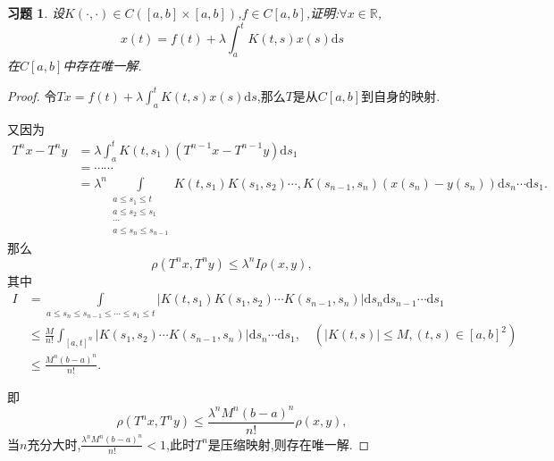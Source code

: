 \documentclass[a4paper,oneside,12pt]{ctexart}
\theoremstyle{plain}
\newtheorem{exercise}{习题}
\theoremstyle{nonumberplain}
\theoremstyle{nonumberplain}
\newtheorem{proof}{证明.}
\newcommand{\dif}{\mathrm{d}}
\newcommand{\R}{\mathbb{R}}
\newcommand{\abs}[1]{\left\vert#1\right\vert}
\begin{document}
    \begin{exercise}
        \label{ex:4}
        设$K(\cdot,\cdot)\in C([a,b]\times [a,b])$,$f\in C[a,b]$,证明:$\forall x\in \R$,
        \begin{equation*}
            x(t)=f(t)+\lambda\int_a^tK(t,s)x(s)\dif s
        \end{equation*}
        在$C[a,b]$中存在唯一解.
    \end{exercise}

    \begin{proof}
        令$Tx=f(t)+\lambda\int_a^tK(t,s)x(s)\dif s$,那么$T$是从$C[a,b]$到自身的映射.

        又因为
        \begin{align*}
            T^nx-T^ny&=\lambda\int_a^tK(t,s_1)(T^{n-1}x-T^{n-1}y)\dif s_1\\
            &=\cdots\cdots\\
            &=\lambda^n\int\limits_{\substack{
                a\leqslant s_1\leqslant t\\
                a\leqslant s_2\leqslant s_1\\
                \cdots\\
                a\leqslant s_n\leqslant s_{n-1}
            }}K(t,s_1)K(s_1,s_2)\cdots,K(s_{n-1},s_n)(x(s_n)-y(s_n))\dif s_n\cdots\dif s_1.
        \end{align*}
        那么 
        \begin{equation*}
            \rho(T^nx,T^ny)\leqslant \lambda^n I\rho(x,y),
        \end{equation*}
        其中 
        \begin{align*}
            I&=\int\limits_{a\leqslant s_n\leqslant s_{n-1}\leqslant\cdots\leqslant s_1\leqslant t}\abs{K(t,s_1)K(s_1,s_2)\cdots K(s_{n-1},s_n)}\dif s_n\dif s_{n-1}\cdots\dif s_1\\
            &\leqslant\frac{M}{n!}\int_{[a,t]^n}\abs{K(s_1,s_2)\cdots K(s_{n-1},s_n)}\dif s_n\cdots \dif s_1,\quad(\abs{K(t,s)}\leqslant M,(t,s)\in[a,b]^2)\\
            &\leqslant \frac{M^n(b-a)^n}{n!}.
        \end{align*}

        即
        \begin{equation*}
            \rho(T^nx,T^ny)\leqslant \frac{\lambda^nM^n(b-a)^n}{n!}\rho(x,y),
        \end{equation*}
        当$n$充分大时,$\frac{\lambda^nM^n(b-a)^n}{n!}<1$,此时$T^n$是压缩映射,则存在唯一解.
    \end{proof}
\end{document}
